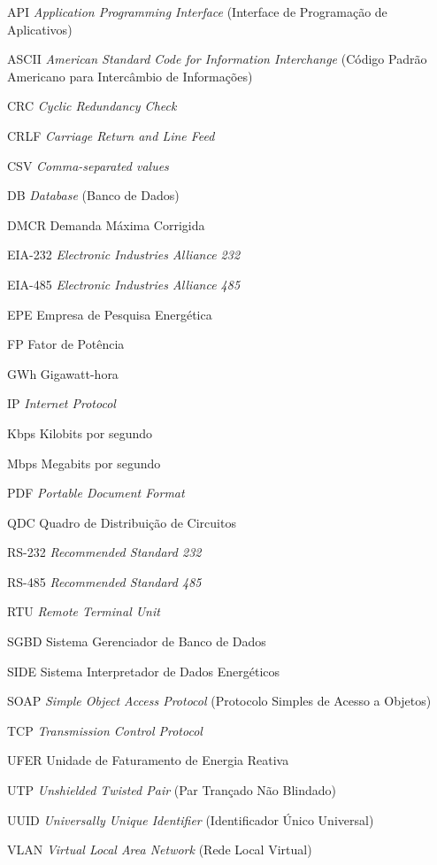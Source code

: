 \begin{siglas}


  \item[API] \textit{Application Programming Interface} (Interface de Programação de Aplicativos)
  \item[ASCII] \textit{American Standard Code for Information Interchange} (Código Padrão Americano para Intercâmbio de Informações)
  \item[CRC] \textit{Cyclic Redundancy Check}
  \item[CRLF] \textit{Carriage Return and Line Feed}
  \item[CSV] \textit{Comma-separated values}
  \item[DB] \textit{Database} (Banco de Dados)
  \item[DMCR] Demanda Máxima Corrigida
  \item[EIA-232] \textit{Electronic Industries Alliance 232}
  \item[EIA-485] \textit{Electronic Industries Alliance 485}
  \item[EPE] Empresa de Pesquisa Energética
  \item[FP] Fator de Potência
  \item[GWh] Gigawatt-hora
  \item[IP] \textit{Internet Protocol}
  \item[Kbps] Kilobits por segundo
  \item[Mbps] Megabits por segundo
  \item[PDF] \textit{Portable Document Format}
  \item[QDC] Quadro de Distribuição de Circuitos
  \item[RS-232] \textit{Recommended Standard 232}
  \item[RS-485] \textit{Recommended Standard 485}
  \item[RTU] \textit{Remote Terminal Unit}
  \item[SGBD] Sistema Gerenciador de Banco de Dados
  \item[SIDE] Sistema Interpretador de Dados Energéticos
  \item[SOAP] \textit{Simple Object Access Protocol} (Protocolo Simples de Acesso a Objetos)
  \item[TCP] \textit{Transmission Control Protocol}
  \item[UFER] Unidade de Faturamento de Energia Reativa
  \item[UTP] \textit{Unshielded Twisted Pair} (Par Trançado Não Blindado)
  \item[UUID] \textit{Universally Unique Identifier} (Identificador Único Universal)
  \item[VLAN] \textit{Virtual Local Area Network} (Rede Local Virtual)
  
\end{siglas}